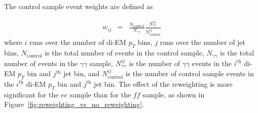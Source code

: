 \documentclass[dissertation.tex]{subfiles}
\begin{document}

The control sample event weights are defined as

\begin{eqnarray}
w_{ij} &=& \frac{N_{\mathrm{control}}}{N_{\gamma\gamma}}\frac{N_{\gamma\gamma}^{ij}}{N_{\mathrm{control}}^{ij}}
\end{eqnarray}
%
where $i$ runs over the number of di-EM $p_{T}$ bins, $j$ runs over the number of jet bins, $N_{\mathrm{control}}$ is the total number of events in the control sample, $N_{\gamma\gamma}$ is the total number of events in the $\gamma\gamma$ sample, $N_{\gamma\gamma}^{ij}$ is the number of $\gamma\gamma$ events in the $i^{\mathrm{th}}$ di-EM $p_{T}$ bin and $j^{\mathrm{th}}$ jet bin, and $N_{\mathrm{control}}^{ij}$ is the number of control sample events in the $i^{\mathrm{th}}$ di-EM $p_{T}$ bin and $j^{\mathrm{th}}$ jet bin.  The effect of the reweighting is more significant for the $ee$ sample than for the $\mathit{ff}$ sample, as shown in Figure~\ref{fig:reweighting_vs_no_reweighting}.

\end{document}
